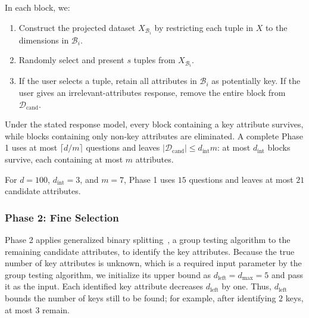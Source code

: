 In each block, we:
\begin{enumerate}
  \item Construct the projected dataset $X_{\mathcal{B}_i}$ by restricting each tuple in $X$ to the dimensions in $\mathcal{B}_i$.
  \item Randomly select and present $s$ tuples from $X_{\mathcal{B}_i}$.
  \item If the user selects a tuple, retain all attributes in $\mathcal{B}_i$ as potentially key. If the user gives an irrelevant-attributes response, remove the entire block from $\mathcal{D}_\text{cand}$.
\end{enumerate}

Under the stated response model, every block containing a key attribute survives, while blocks containing only non-key attributes are eliminated. A complete Phase 1 uses at most $\lceil d/m\rceil$ questions and leaves $\lvert\mathcal{D}_\text{cand}\rvert\leq d_\text{int}m$: at most $d_\text{int}$ blocks survive, each containing at most $m$ attributes.

\begin{example}
    For $d=100$, $d_\text{int}=3$, and $m=7$, Phase 1 uses $15$ questions and leaves at most $21$ candidate attributes.
\end{example}

\subsubsection{\textbf{Phase 2: Fine Selection}}

Phase 2 applies generalized binary splitting~\cite{WGT}, a group testing algorithm to the remaining candidate attributes, to identify the key attributes. Because the true number of key attributes is unknown, which is a required input parameter by the group testing algorithm, we initialize its upper bound as $d_\text{left}=d_\text{max}=5$ and pass it as the input. Each identified key attribute decreases $d_\text{left}$ by one. Thus, $d_\text{left}$ bounds the number of keys still to be found; for example, after identifying $2$ keys, at most $3$ remain.

